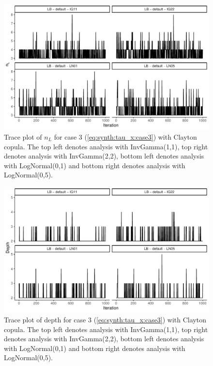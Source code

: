 \documentclass{amsart}
\begin{document}
\begin{figure}
	\centering
	\includegraphics[width = 0.75\linewidth]{trace_case3_clayton_nterm.pdf}
	\caption{Trace plot of $n_L$ for case 3 (\cref{eq:synth:tau_x:case3}) with Clayton copula. The top left denotes analysis with InvGamma(1,1), top right denotes analysis with InvGamma(2,2), bottom left denotes analysis with LogNormal(0,1) and bottom right denotes analysis with LogNormal(0,5).}
	\label{fig:case3:clayton:nterm}
\end{figure}

\begin{figure}
	\centering
	\includegraphics[width = 0.75\linewidth]{trace_case3_clayton_depth.pdf}
	\caption{Trace plot of depth for case 3 (\cref{eq:synth:tau_x:case3}) with Clayton copula. The top left denotes analysis with InvGamma(1,1), top right denotes analysis with InvGamma(2,2), bottom left denotes analysis with LogNormal(0,1) and bottom right denotes analysis with LogNormal(0,5).}
	\label{fig:case3:clayton:depth}
\end{figure}
\end{document}
